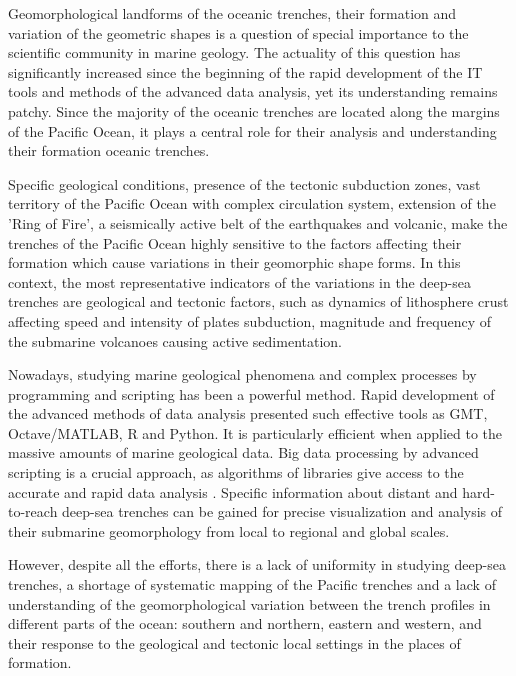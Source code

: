 \documentclass[11pt,a4paper]{report}
\begin{document}
Geomorphological landforms of the oceanic trenches, their formation and variation of the geometric shapes is a question of special importance to the scientific community in marine geology. The actuality of this question has significantly increased since the beginning of the rapid development of the IT tools and methods of the advanced data analysis, yet its understanding remains patchy. Since the majority of the oceanic trenches are located along the margins of the Pacific Ocean, it plays a central role for their analysis and understanding their formation oceanic trenches. \par
Specific geological conditions, presence of the tectonic subduction zones, vast territory of the Pacific Ocean with complex circulation system, extension of the 'Ring of Fire', a seismically active belt of the earthquakes and volcanic, make the trenches of the Pacific Ocean highly sensitive to the factors affecting their formation which cause variations in their geomorphic shape forms. In this context, the most representative indicators of the variations in the deep-sea trenches are geological and tectonic factors, such as dynamics of lithosphere crust affecting speed and intensity of plates subduction, magnitude and frequency of the submarine volcanoes causing active sedimentation. \par
Nowadays, studying marine geological phenomena and complex processes by programming and scripting has been a powerful method. Rapid development of the advanced methods of data analysis presented such effective tools as GMT, Octave/MATLAB, R and Python. It is particularly efficient when applied to the massive amounts of marine geological data. Big data processing by advanced scripting is a crucial approach, as algorithms of libraries give access to the accurate and rapid data analysis \cite{Lemenkova202110}. Specific information about distant and hard-to-reach deep-sea trenches can be gained for precise visualization and analysis of their submarine geomorphology from local to regional and global scales. \par
However, despite all the efforts, there is a lack of uniformity in studying deep-sea trenches, a shortage of systematic mapping of the Pacific trenches and a lack of understanding of the geomorphological variation between the trench profiles in different parts of the ocean: southern and northern, eastern and western, and their response to the geological and tectonic local settings in the places of formation. \par
\end{document}
